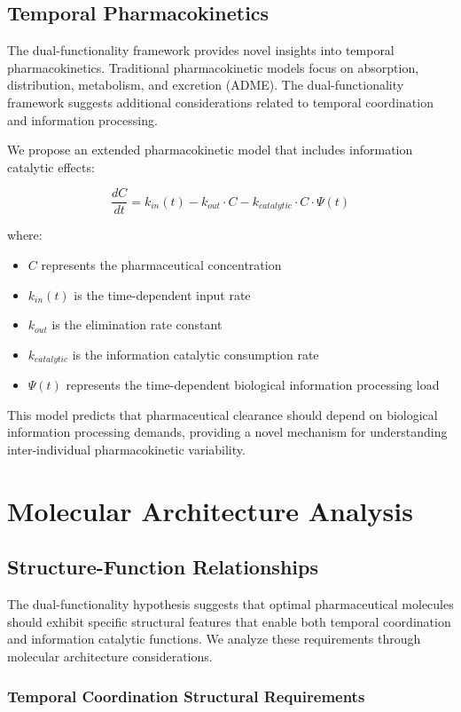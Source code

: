 \documentclass[12pt,a4paper]{article}
\begin{document}
\subsection{Temporal Pharmacokinetics}

The dual-functionality framework provides novel insights into temporal pharmacokinetics. Traditional pharmacokinetic models focus on absorption, distribution, metabolism, and excretion (ADME). The dual-functionality framework suggests additional considerations related to temporal coordination and information processing.

We propose an extended pharmacokinetic model that includes information catalytic effects:

$$\frac{dC}{dt} = k_{in}(t) - k_{out} \cdot C - k_{catalytic} \cdot C \cdot \Psi(t)$$

where:
\begin{itemize}
\item $C$ represents the pharmaceutical concentration
\item $k_{in}(t)$ is the time-dependent input rate
\item $k_{out}$ is the elimination rate constant
\item $k_{catalytic}$ is the information catalytic consumption rate
\item $\Psi(t)$ represents the time-dependent biological information processing load
\end{itemize}

This model predicts that pharmaceutical clearance should depend on biological information processing demands, providing a novel mechanism for understanding inter-individual pharmacokinetic variability.

\section{Molecular Architecture Analysis}

\subsection{Structure-Function Relationships}

The dual-functionality hypothesis suggests that optimal pharmaceutical molecules should exhibit specific structural features that enable both temporal coordination and information catalytic functions. We analyze these requirements through molecular architecture considerations.

\subsubsection{Temporal Coordination Structural Requirements}
\end{document}
